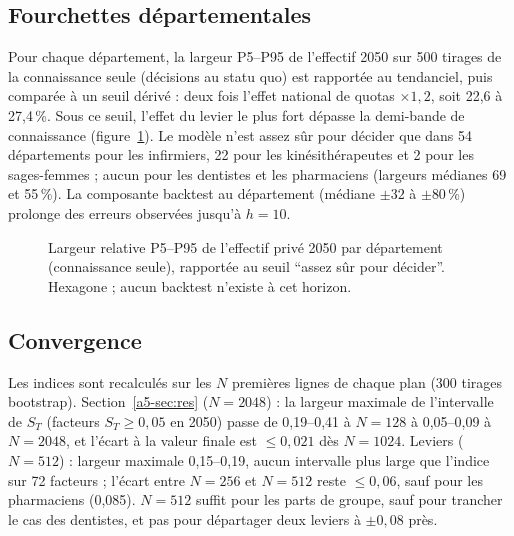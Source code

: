 \subsection{Fourchettes départementales}
Pour chaque département, la largeur P5--P95 de l'effectif 2050 sur 500 tirages de la connaissance seule (décisions au
statu quo) est rapportée au tendanciel, puis comparée à un seuil dérivé : deux fois l'effet national de quotas
$\times 1{,}2$, soit 22,6 à 27,4\,\%\derive{}. Sous ce seuil, l'effet du levier le plus fort dépasse la demi-bande
de connaissance (figure~\ref{a5-fig:carte}). Le modèle n'est assez sûr pour décider que dans 54\mesure{} départements
pour les infirmiers, 22\mesure{} pour les kinésithérapeutes et 2\mesure{} pour les sages-femmes ; aucun pour les
dentistes et les pharmaciens (largeurs médianes 69 et 55\,\%\mesure{}). La composante backtest au département
(médiane $\pm 32$ à $\pm 80$\,\%\derive{}) prolonge des erreurs observées jusqu'à $h = 10$.

\begin{figure}[h]\centering
\resizebox{\textwidth}{!}{}
\caption{Largeur relative P5--P95 de l'effectif privé 2050 par département (connaissance seule), rapportée au seuil
\enquote{assez sûr pour décider}. Hexagone ; aucun backtest n'existe à cet horizon.}\label{a5-fig:carte}
\end{figure}

\subsection{Convergence}
Les indices sont recalculés sur les $N$ premières lignes de chaque plan (300 tirages bootstrap). Section~\ref{a5-sec:res}
($N = 2048$) : la largeur maximale de l'intervalle de $S_T$ (facteurs $S_T \ge 0{,}05$ en 2050) passe de 0,19--0,41 à
$N = 128$ à 0,05--0,09\mesure{} à $N = 2048$, et l'écart à la valeur finale est $\le 0{,}021$\mesure{} dès
$N = 1024$. Leviers ($N = 512$) : largeur maximale 0,15--0,19\mesure{}, aucun intervalle plus large que l'indice sur
72 facteurs ; l'écart entre $N = 256$ et $N = 512$ reste $\le 0{,}06$\mesure{}, sauf pour les pharmaciens
(0,085\mesure{}). $N = 512$ suffit pour les parts de groupe, sauf pour trancher le cas des dentistes, et pas pour
départager deux leviers à $\pm 0{,}08$ près.

